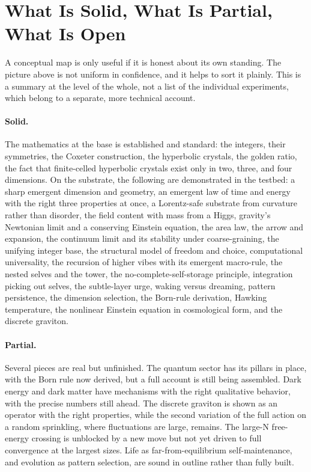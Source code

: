 \section{What Is Solid, What Is Partial, What Is Open}
\label{sec:status}

A conceptual map is only useful if it is honest about its own standing. The picture above is
not uniform in confidence, and it helps to sort it plainly. This is a summary at the level of
the whole, not a list of the individual experiments, which belong to a separate, more technical
account.

\paragraph{Solid.}
The mathematics at the base is established and standard: the integers, their symmetries, the
Coxeter construction, the hyperbolic crystals, the golden ratio, the fact that finite-celled
hyperbolic crystals exist only in two, three, and four dimensions. On the substrate, the
following are demonstrated in the testbed: a sharp emergent dimension and geometry, an emergent
law of time and energy with the right three properties at once, a Lorentz-safe substrate from
curvature rather than disorder, the field content with mass from a Higgs, gravity's Newtonian
limit and a conserving Einstein equation, the area law, the arrow and expansion, the continuum
limit and its stability under coarse-graining, the unifying integer base, the structural model
of freedom and choice, computational universality, the recursion of higher vibes with its
emergent macro-rule, the nested selves and the tower, the no-complete-self-storage principle,
integration picking out selves, the subtle-layer urge, waking versus dreaming, pattern
persistence, the dimension selection, the Born-rule derivation, Hawking temperature, the
nonlinear Einstein equation in cosmological form, and the discrete graviton.

\paragraph{Partial.}
Several pieces are real but unfinished. The quantum sector has its pillars in place, with the
Born rule now derived, but a full account is still being assembled. Dark energy and dark matter
have mechanisms with the right qualitative behavior, with the precise numbers still ahead. The
discrete graviton is shown as an operator with the right properties, while the second variation
of the full action on a random sprinkling, where fluctuations are large, remains. The large-N
free-energy crossing is unblocked by a new move but not yet driven to full convergence at the
largest sizes. Life as far-from-equilibrium self-maintenance, and evolution as pattern
selection, are sound in outline rather than fully built.

